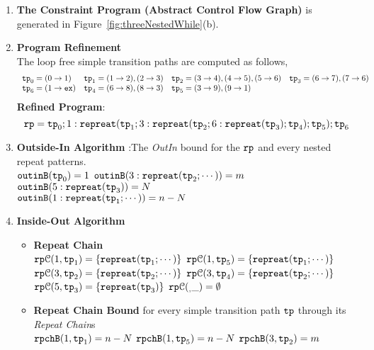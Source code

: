 \begin{enumerate}
  \item  \textbf{The Constraint Program (Abstract Control Flow Graph)} is generated in Figure~\ref{fig:threeNestedWhile}(b).

  \item \textbf{Program Refinement}
  \\
  The loop free simple transition paths are computed as follows,
  \[
      \begin{array}{llll}
          \mathtt{tp}_0 = (0 \to 1)
          &
          \mathtt{tp}_1 = (1 \to 2), (2 \to 3)
          &           
          \mathtt{tp}_2 = (3 \to 4), (4 \to 5), (5 \to 6)
          &
          \mathtt{tp}_3 = (6 \to 7), (7 \to 6)
          \\
          \mathtt{tp}_6 = (1 \to \mathtt{ex})
          &
          \mathtt{tp}_4 = (6 \to 8), (8 \to 3)
          &
          \mathtt{tp}_5 = (3 \to 9), (9 \to 1)
      \end{array}
      \]
  \textbf{Refined Program}:
  \[
  \mathtt{rp} = \mathtt{tp}_0 ; 1: \mathtt{repreat}(\mathtt{tp}_1; 3: \mathtt{repreat}(\mathtt{tp}_2; 6 : \mathtt{repreat}(\mathtt{tp}_3); \mathtt{tp}_4); \mathtt{tp}_5); \mathtt{tp}_6
  \]
  \item \textbf{Outside-In Algorithm} :The \emph{OutIn} bound for the $\mathtt{rp}$ and every nested repeat patterns.
  \\
$\mathtt{outinB}(\mathtt{tp}_0) = 1$
\quad
$\mathtt{outinB}(3: \mathtt{repreat}(\mathtt{tp}_2; \cdots)) = m $
\quad
$\mathtt{outinB}(5 : \mathtt{repreat}(\mathtt{tp}_3)) = N $
\\
$\mathtt{outinB}(1: \mathtt{repreat}(\mathtt{tp}_1; \cdots)) = n - N $
\item \textbf{Inside-Out Algorithm}
\begin{itemize}
  \item \textbf{Repeat Chain}
  \\
  $\mathtt{rp}\mathcal{C}(1, \mathtt{tp}_1) = \{\mathtt{repreat}(\mathtt{tp}_1; \cdots)\}$ \quad
  $\mathtt{rp}\mathcal{C}(1, \mathtt{tp}_5) = \{\mathtt{repreat}(\mathtt{tp}_1; \cdots)\}$ \\
  $\mathtt{rp}\mathcal{C}(3, \mathtt{tp}_2) = \{\mathtt{repreat}(\mathtt{tp}_2; \cdots)\}$ \quad
  $\mathtt{rp}\mathcal{C}(3, \mathtt{tp}_4) = \{\mathtt{repreat}(\mathtt{tp}_2; \cdots)\}$ \\
  $\mathtt{rp}\mathcal{C}(5, \mathtt{tp}_3) = \{\mathtt{repreat}(\mathtt{tp}_3)\}$ \quad \quad
  $\mathtt{rp}\mathcal{C}(_, \_) = \emptyset$ 
  \item \textbf{Repeat Chain Bound} for every simple transition path $\mathtt{tp}$ through its \emph{Repeat Chain}s
  \\
  $\mathtt{rpchB}(1, \mathtt{tp}_1) = n - N$ \quad
  $\mathtt{rpchB}(1, \mathtt{tp}_5) = n - N$ \quad
  $\mathtt{rpchB}(3, \mathtt{tp}_2) = m$ \\

\end{itemize}
\end{enumerate}
